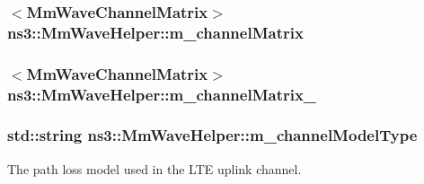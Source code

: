 \subsubsection[{\texorpdfstring{m\+\_\+channel\+Matrix}{m_channelMatrix}}]{$<${\bf Mm\+Wave\+Channel\+Matrix}$>$ ns3\+::\+Mm\+Wave\+Helper\+::m\+\_\+channel\+Matrix\hspace{0.3cm}{\ttfamily [private]}}\hypertarget{classns3_1_1MmWaveHelper_a731a9e28a12edacd78b96800025db070}{}\label{classns3_1_1MmWaveHelper_a731a9e28a12edacd78b96800025db070}
\subsubsection[{\texorpdfstring{m\+\_\+channel\+Matrix\+\_\+2}{m_channelMatrix_2}}]{$<${\bf Mm\+Wave\+Channel\+Matrix}$>$ ns3\+::\+Mm\+Wave\+Helper\+::m\+\_\+channel\+Matrix\+\_\hspace{0.3cm}{\ttfamily [private]}}\hypertarget{classns3_1_1MmWaveHelper_af2907a9f5719984dfef74e3736e35bc5}{}\label{classns3_1_1MmWaveHelper_af2907a9f5719984dfef74e3736e35bc5}
\subsubsection[{\texorpdfstring{m\+\_\+channel\+Model\+Type}{m_channelModelType}}]{\setlength{\rightskip}{0pt plus 5cm}std\+::string ns3\+::\+Mm\+Wave\+Helper\+::m\+\_\+channel\+Model\+Type\hspace{0.3cm}{\ttfamily [private]}}\hypertarget{classns3_1_1MmWaveHelper_aec88d691230f0db9448a7f953301bb24}{}\label{classns3_1_1MmWaveHelper_aec88d691230f0db9448a7f953301bb24}


The path loss model used in the L\+TE uplink channel. 

